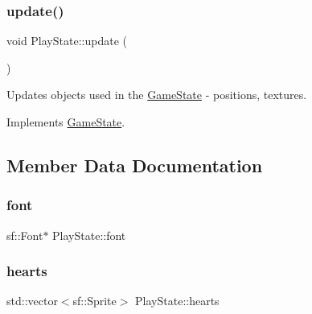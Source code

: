 \subsubsection{\texorpdfstring{update()}{update()}}
{\footnotesize\ttfamily void Play\+State\+::update (\begin{DoxyParamCaption}\item[{\mbox{\hyperlink{class_game_engine}{Game\+Engine}} $\ast$}]{ }\end{DoxyParamCaption})\hspace{0.3cm}{\ttfamily [virtual]}}



Updates objects used in the \mbox{\hyperlink{class_game_state}{Game\+State}} -\/ positions, textures. 



Implements \mbox{\hyperlink{class_game_state_a66b11afe355a9479f94aaf76576980bd}{Game\+State}}.



\subsection{Member Data Documentation}
\mbox{\label{class_play_state_a72f2eb472360c9a4e197c56ab9eaa5bb}} 
\subsubsection{\texorpdfstring{font}{font}}
{\footnotesize\ttfamily sf\+::\+Font$\ast$ Play\+State\+::font\hspace{0.3cm}{\ttfamily [private]}}

\mbox{\label{class_play_state_a3180d954e9ee3b6b0ada1f69e39dcd2e}} 
\subsubsection{\texorpdfstring{hearts}{hearts}}
{\footnotesize\ttfamily std\+::vector$<$sf\+::\+Sprite$>$ Play\+State\+::hearts\hspace{0.3cm}{\ttfamily [private]}}

\mbox{\label{class_play_state_a7650bd53de2203e1d9364b9dc09bcf31}} 

